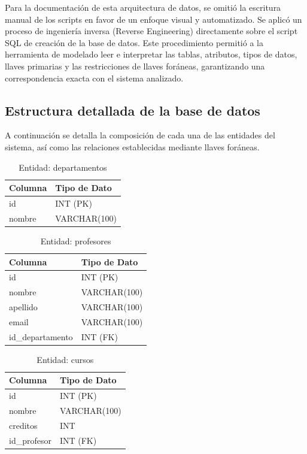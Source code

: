 \documentclass[12pt,letterpaper]{article}
\begin{document}
Para la documentación de esta arquitectura de datos, se omitió la escritura manual de los scripts en favor de un enfoque visual y automatizado. Se aplicó un proceso de ingeniería inversa (Reverse Engineering) directamente sobre el script SQL de creación de la base de datos. Este procedimiento permitió a la herramienta de modelado leer e interpretar las tablas, atributos, tipos de datos, llaves primarias y las restricciones de llaves foráneas, garantizando una correspondencia exacta con el sistema analizado.

\subsection{Estructura detallada de la base de datos}

A continuación se detalla la composición de cada una de las entidades del sistema, así como las relaciones establecidas mediante llaves foráneas.

\begin{table}[H]
    \centering
    \begin{tabular}{|l|l|}
    \hline
    \textbf{Columna} & \textbf{Tipo de Dato} \\ \hline
    id & INT (PK) \\ 
    nombre & VARCHAR(100) \\ \hline
    \end{tabular}
    \caption{Entidad: departamentos}
\end{table}

\begin{table}[H]
    \centering
    \begin{tabular}{|l|l|}
    \hline
    \textbf{Columna} & \textbf{Tipo de Dato} \\ \hline
    id & INT (PK) \\ 
    nombre & VARCHAR(100) \\ 
    apellido & VARCHAR(100) \\ 
    email & VARCHAR(100) \\ 
    id\_departamento & INT (FK) \\ \hline
    \end{tabular}
    \caption{Entidad: profesores}
\end{table}

\begin{table}[H]
    \centering
    \begin{tabular}{|l|l|}
    \hline
    \textbf{Columna} & \textbf{Tipo de Dato} \\ \hline
    id & INT (PK) \\ 
    nombre & VARCHAR(100) \\ 
    creditos & INT \\ 
    id\_profesor & INT (FK) \\ \hline
    \end{tabular}
    \caption{Entidad: cursos}
\end{table}
\end{document}
